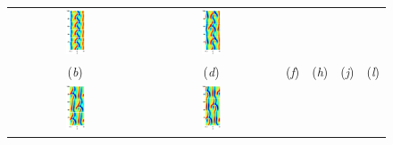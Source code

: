 \begin{figure}[t]
\begin{center}
\begin{tabular}{cccccc}
\includegraphics[width=0.15\textwidth, clip=true]{figs_bmp/ks22rpo020.5-00.00.eps}\hspace{-3ex} &
\includegraphics[width=0.15\textwidth, clip=true]{figs_bmp/ks22rpo066.8-00.00.eps}\\
(\textit{b}) & (\textit{d}) & (\textit{f}) &
(\textit{h}) & (\textit{j}) & (\textit{l})\\
\includegraphics[width=0.15\textwidth, clip=true]{figs_bmp/ks22rpo032.8-10.96.eps}\hspace{-3ex} &
\includegraphics[width=0.15\textwidth, clip=true]{figs_bmp/ks22rpo034.6-09.60.eps}\hspace{-3ex} &

\end{tabular}
\end{center}
\end{figure}
